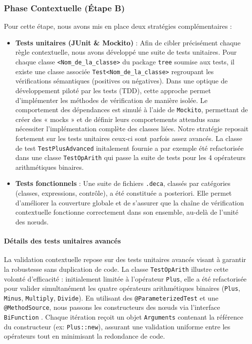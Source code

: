 \subsubsection{Phase Contextuelle (Étape B)} 
Pour cette étape, nous avons mis en place deux stratégies complémentaires :
\begin{itemize}[label=$\circ$]
    \item \textbf{Tests unitaires (JUnit \& Mockito)} : Afin de cibler précisément chaque règle contextuelle, nous avons développé une suite de tests unitaires. Pour chaque classe \texttt{<Nom\_de\_la\_classe>} du package \texttt{tree} soumise aux tests, il existe une classe associée \texttt{Test<Nom\_de\_la\_classe>} regroupant les vérifications sémantiques (positives ou négatives). Dans une optique de développement piloté par les tests (TDD), cette approche permet d'implémenter les méthodes de vérification de manière isolée. Le comportement des dépendances est simulé à l'aide de \texttt{Mockito}, permettant de créer des « mocks » et de définir leurs comportements attendus sans nécessiter l'implémentation complète des classes liées.
    Notre stratégie reposait fortement sur les tests unitaires ceux-ci sont parfois assez avancés. La classe de test \texttt{TestPlusAdvanced} initalement fournie a par exemple été refactorisée dans une classe \texttt{TestOpArith} qui passe la suite de tests pour les 4 opérateurs arithmétiques binaires. 
    \item \textbf{Tests fonctionnels} : Une suite de fichiers \texttt{.deca}, classés par catégories (classes, expressions, contrôle), a été constituée a posteriori. Elle permet d'améliorer la couverture globale et de s'assurer que la chaîne de vérification contextuelle fonctionne correctement dans son ensemble, au-delà de l'unité des nœuds.
\end{itemize}

\paragraph*{Détails des tests unitaires avancés} 
\noindent
La validation contextuelle repose sur des tests unitaires avancés visant à garantir la robustesse sans duplication de code.  La classe \texttt{TestOpArith} illustre cette volonté d'efficacité : initialement limitée à l'opérateur \texttt{Plus}, elle a été refactorisée pour valider simultanément les quatre opérateurs arithmétiques binaires (\texttt{Plus}, \texttt{Minus}, \texttt{Multiply}, \texttt{Divide}). En utilisant des \texttt{@ParameterizedTest} \cite{junit6-parameterized} et une \texttt{@MethodSource}, nous passons les constructeurs des nœuds via l'interface \texttt{BiFunction} \cite{java8-bifunction}. Chaque itération reçoit un objet \texttt{Arguments} \cite{junit5-arguments} contenant la référence du constructeur (ex: \texttt{Plus::new}), assurant une validation uniforme entre les opérateurs tout en minimisant la redondance de code.

